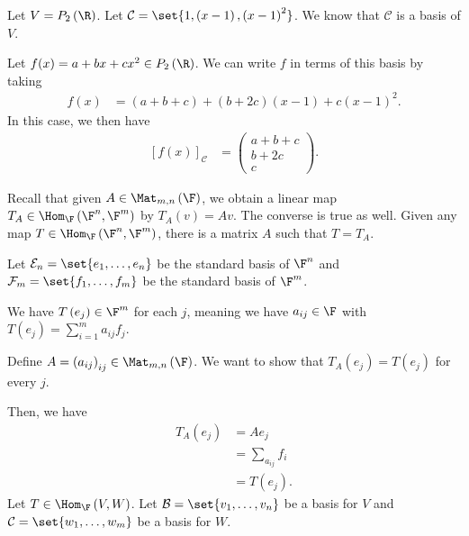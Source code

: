 \documentclass[10pt]{mypackage}
\begin{document}
\begin{example}
  Let $V = P_2\left(\R\right)$. Let $\mathcal{C} = \set{1,\left(x-1\right),\left(x-1\right)^2}$. We  know that $\mathcal{C}$ is a basis of $V$.\newline

  Let $f(x) = a + bx + cx^2\in P_2\left(\R\right)$. We can write $f$ in terms of this basis by taking
  \begin{align*}
    f(x) &= \left(a+b+c\right) + \left(b+2c\right)\left(x-1\right) + c\left(x-1\right)^2.
  \end{align*}
  In this case, we then have
  \begin{align*}
    \left[f(x)\right]_{\mathcal{C}} &= \begin{pmatrix}a+b+c\\b+2c\\c\end{pmatrix}.
  \end{align*}
\end{example}
Recall that given $A\in \Mat_{m,n}\left(\F\right)$, we obtain a linear map $T_{A}\in \Hom_{\F}\left(\F^{n},\F^{m}\right)$ by $T_A\left(v\right) = Av$. The converse is true as well. Given any map $T\in \Hom_{\F}\left(\F^{n},\F^{m}\right)$, there is a matrix $A$ such that $T = T_A$.\newline

Let $\mathcal{E}_n = \set{e_1,\dots,e_n}$ be the standard basis of $\F^n$ and $\mathcal{F}_m = \set{f_1,\dots,f_m}$ be the standard basis of $\F^{m}$.\newline

We have $T\left(e_j\right)\in \F^m$ for each $j$, meaning we have $a_{ij}\in \F$ with $T\left(e_j\right) = \sum_{i=1}^{m}a_{ij}f_j$.\newline

Define $A = \left(a_{ij}\right)_{ij}\in \Mat_{m,n}\left(\F\right)$. We want to show that $T_A\left(e_j\right) = T\left(e_j\right)$ for every $j$.\newline

Then, we have
\begin{align*}
  T_A\left(e_j\right) &= Ae_j\\
                      &= \sum_{a_{ij}}f_i\\
                      &= T\left(e_j\right).
\end{align*}
Let $T\in \Hom_{\F}\left(V,W\right)$. Let $\mathcal{B} = \set{v_1,\dots,v_n}$ be a basis for $V$ and $\mathcal{C} = \set{w_1,\dots,w_m}$ be a basis for $W$.\newline
\end{document}
